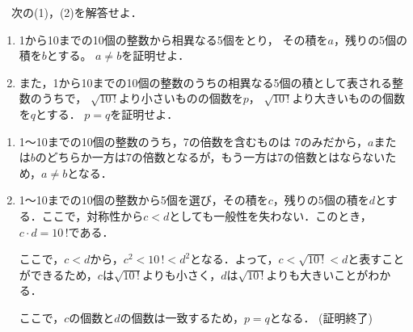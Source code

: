 \begin{problem}
  　次の(1)，(2)を解答せよ．
\begin{enumerate}
\item 1から10までの10個の整数から相異なる5個をとり，
その積を$a$，残りの5個の積を$b$とする。
$a \neq b$を証明せよ．
\item また，1から10までの10個の整数のうちの相異なる5個の積として表される整数のうちで，
$\sqrt{10 \, !}$より小さいものの個数を$p$，
$\sqrt{10 \, !}$より大きいものの個数を$q$とする．
$p=q$を証明せよ．
\end{enumerate}
\end{problem}

\begin{enumerate}
  \item 1～10までの10個の整数のうち，7の倍数を含むものは
  7のみだから，$a$または$b$のどちらか一方は7の倍数となるが，もう一方は7の倍数とはならないため，$a \neq b$となる．

  \item 1～10までの10個の整数から5個を選び，その積を$c$，残りの5個の積を$d$とする．ここで，対称性から$c < d$としても一般性を失わない．このとき，$c\cdot d = 10\,!$である．

  ここで，$c < d$から，$c^2 < 10\,! < d^2$となる．よって，$c < \sqrt{10\,!} < d$と表すことができるため，$c$は$\sqrt{10\,!}$よりも小さく，$d$は$\sqrt{10\,!}$よりも大きいことがわかる．

  ここで，$c$の個数と$d$の個数は一致するため，$p = q$となる．
  \hfill
  (証明終了)
\end{enumerate}
